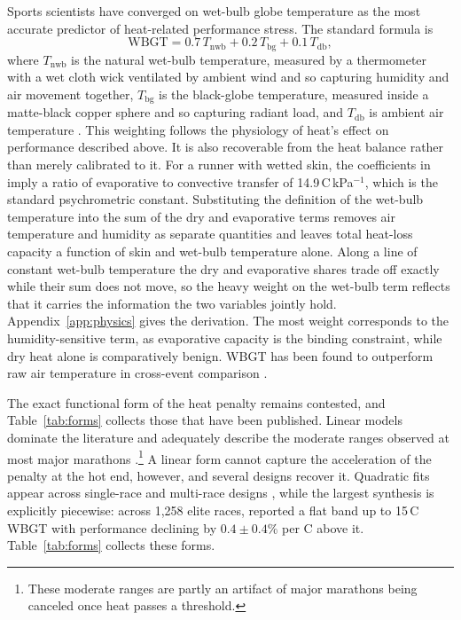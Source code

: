 \documentclass[11pt]{article}
\renewcommand{\_}{\textunderscore\allowbreak}
\begin{document}
Sports scientists have converged on wet-bulb globe temperature as the most accurate predictor of heat-related performance stress. The standard formula is
\begin{equation}
  \mathrm{WBGT} = 0.7\,T_{\mathrm{nwb}} + 0.2\,T_{\mathrm{bg}} + 0.1\,T_{\mathrm{db}},
\end{equation}
where $T_{\mathrm{nwb}}$ is the natural wet-bulb temperature, measured by a thermometer with a wet cloth wick ventilated by ambient wind and so capturing humidity and air movement together, $T_{\mathrm{bg}}$ is the black-globe temperature, measured inside a matte-black copper sphere and so capturing radiant load, and $T_{\mathrm{db}}$ is ambient air temperature \citep{cheuvront2021}. This weighting follows the physiology of heat's effect on performance described above. It is also recoverable from the heat balance rather than merely calibrated to it. For a runner with wetted skin, the coefficients in \citet{taylor2006} imply a ratio of evaporative to convective transfer of 14.9\,\textdegree C\,kPa$^{-1}$, which is the standard psychrometric constant. Substituting the definition of the wet-bulb temperature into the sum of the dry and evaporative terms removes air temperature and humidity as separate quantities and leaves total heat-loss capacity a function of skin and wet-bulb temperature alone. Along a line of constant wet-bulb temperature the dry and evaporative shares trade off exactly while their sum does not move, so the heavy weight on the wet-bulb term reflects that it carries the information the two variables jointly hold. Appendix~\ref{app:physics} gives the derivation. The most weight corresponds to the humidity-sensitive term, as evaporative capacity is the binding constraint, while dry heat alone is comparatively benign. WBGT has been found to outperform raw air temperature in cross-event comparison \citep{mantzios2022, ely2007, aylwin2023}.  

The exact functional form of the heat penalty remains contested, and Table~\ref{tab:forms} collects those that have been published. Linear models dominate the literature and adequately describe the moderate ranges observed at most major marathons \citep{ely2007, knechtle2019, nikolaidis2019, vernon2021}.\footnote{These moderate ranges are partly an artifact of major marathons being canceled once heat passes a threshold.} A linear form cannot capture the acceleration of the penalty at the hot end, however, and several designs recover it. Quadratic fits appear across single-race and multi-race designs \citep{martin1999, elhelou2012, gasparetto2020}, while the largest synthesis is explicitly piecewise: across 1{,}258 elite races, \citet{mantzios2022} reported a flat band up to 15\,\textdegree C WBGT with performance declining by $0.4 \pm 0.4\%$ per \textdegree C above it. Table~\ref{tab:forms} collects these forms.
\end{document}
